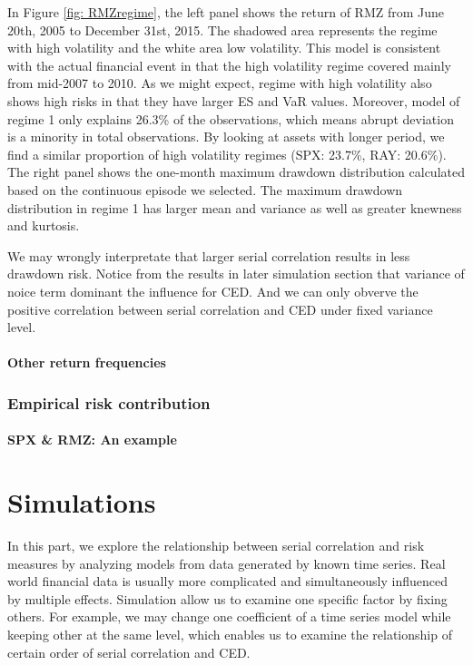 \documentclass[11pt]{article}
\begin{document}
In Figure \ref{fig: RMZregime}, the left panel shows the return of RMZ from June 20th, 2005 to December 31st, 2015. The shadowed area represents the regime with high volatility and the white area low volatility. This model is consistent with the actual financial event in that the high volatility regime covered mainly from mid-2007 to 2010. As we might expect, regime with high volatility also shows high risks in that they have larger ES and VaR values. Moreover, model of regime 1 only explains 26.3\% of the observations, which means abrupt deviation is a minority in total observations. By looking at assets with longer period, we find a similar proportion of high volatility regimes (SPX: 23.7\%, RAY: 20.6\%). The right panel shows the one-month maximum drawdown distribution calculated based on the continuous episode we selected. The maximum drawdown distribution in regime 1 has larger mean and variance as well as greater knewness and kurtosis. 

We may wrongly interpretate that larger serial correlation results in less drawdown risk. Notice from the results in later simulation section that variance of noice term dominant the influence for CED. And we can only obverve the positive correlation between serial correlation and CED under fixed variance level.


\subsection{Other return frequencies}

\section{Empirical risk contribution}
\subsection{SPX \& RMZ: An example}

\part{Simulations}

In this part, we explore the relationship between serial correlation and risk measures by analyzing models from data generated by known time series. Real world financial data is usually more complicated and simultaneously influenced by multiple effects. Simulation allow us to examine one specific factor by fixing others. For example, we may change one coefficient of a time series model while keeping other at the same level, which enables us to examine the relationship of certain order of serial correlation and CED.
\end{document}
